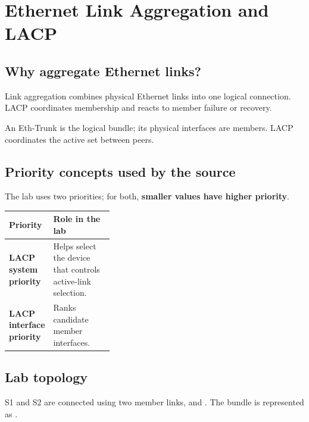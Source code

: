 \chapter{Ethernet Link Aggregation and LACP}\label{ch:lacp}

\section{Why aggregate Ethernet links?}
Link aggregation combines physical Ethernet links into one logical connection. LACP coordinates membership and reacts to member failure or recovery.



\begin{keyidea}
An Eth-Trunk is the logical bundle; its physical interfaces are members. LACP coordinates the active set between peers.
\end{keyidea}

\section{Priority concepts used by the source}
The lab uses two priorities; for both, \textbf{smaller values have higher priority}.

\begin{tabularx}{\linewidth}{>{\bfseries}p{0.35\linewidth}X}
\toprule
Priority & Role in the lab\\\midrule
LACP system priority & Helps select the device that controls active-link selection.\\
LACP interface priority & Ranks candidate member interfaces.\\\bottomrule
\end{tabularx}

\section{Lab topology}
S1 and S2 are connected using two member links,  and . The bundle is represented as .

